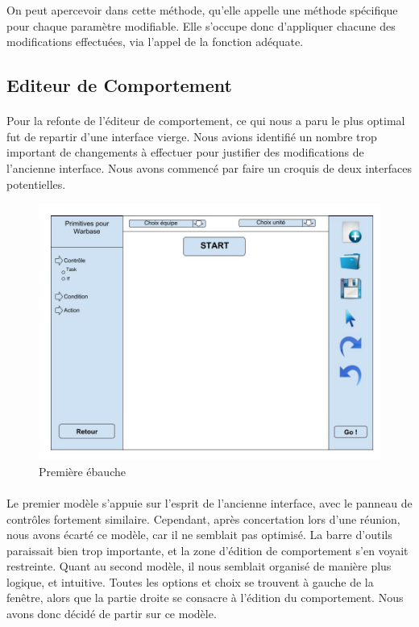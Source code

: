 \documentclass{report}
\begin{document}
On peut apercevoir dans cette méthode, qu'elle appelle une méthode spécifique pour chaque paramètre modifiable.
Elle s'occupe donc d'appliquer chacune des modifications effectuées, via l'appel de la fonction adéquate.




\subsection{Editeur de Comportement}
\paragraph{}
Pour la refonte de l'éditeur de comportement, ce qui nous a paru le plus optimal fut de repartir d'une interface vierge. Nous avions identifié un nombre trop important de changements à effectuer pour justifier des modifications de l'ancienne interface.
Nous avons commencé par faire un croquis de deux interfaces potentielles.
\begin{figure}[!h]
	\centering
		\includegraphics[scale=0.35]{ConceptionGraphique1}
	\caption{Première ébauche}
\end{figure}


\paragraph{}
Le premier modèle s'appuie sur l'esprit de l'ancienne interface, avec le panneau de contrôles fortement similaire. Cependant, après concertation lors d'une réunion, nous avons écarté ce modèle, car il ne semblait pas optimisé. La barre d'outils paraissait bien trop importante, et la zone d'édition de comportement s'en voyait restreinte.\clearpage
Quant au second modèle, il nous semblait organisé de manière plus logique, et intuitive. Toutes les options et choix se trouvent à gauche de la fenêtre, alors que la partie droite se consacre à l'édition du comportement.\newline
Nous avons donc décidé de partir sur ce modèle.
\end{document}
